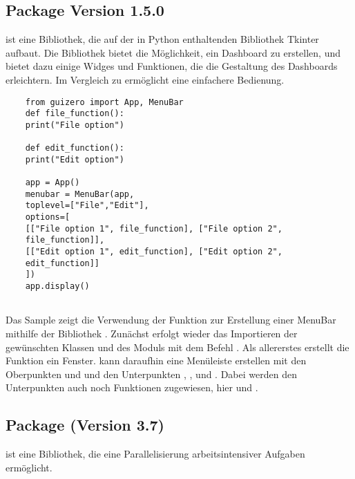 \subsection{Package  Version 1.5.0}

 ist eine Bibliothek, die auf der in Python enthaltenden Bibliothek Tkinter aufbaut. Die Bibliothek bietet die Möglichkeit, ein Dashboard zu erstellen, und bietet dazu einige Widges und Funktionen, die die Gestaltung des Dashboards erleichtern.  Im Vergleich zu  ermöglicht  eine einfachere Bedienung.

\begin{verbatim}
    from guizero import App, MenuBar
    def file_function():
    print("File option")
    
    def edit_function():
    print("Edit option")
    
    app = App()
    menubar = MenuBar(app, 
    toplevel=["File","Edit"],
    options=[
    [["File option 1", file_function], ["File option 2",
    file_function]], 
    [["Edit option 1", edit_function], ["Edit option 2",
    edit_function]]
    ])
    app.display()
    
\end{verbatim}

Das Sample zeigt die Verwendung der Funktion zur Erstellung einer MenuBar mithilfe der Bibliothek . 
Zunächst erfolgt wieder das Importieren der gewünschten Klassen  und  des Moduls  mit dem Befehl .
Als allererstes erstellt die Funktion  ein Fenster.
 kann daraufhin eine Menüleiste erstellen mit den Oberpunkten  und  und den Unterpunkten , ,  und .
Dabei werden den Unterpunkten auch noch Funktionen zugewiesen, hier  und . \cite{Sach:2020}

\subsection{Package  (Version 3.7)}

 ist eine Bibliothek, die eine Parallelisierung arbeitsintensiver Aufgaben ermöglicht.

